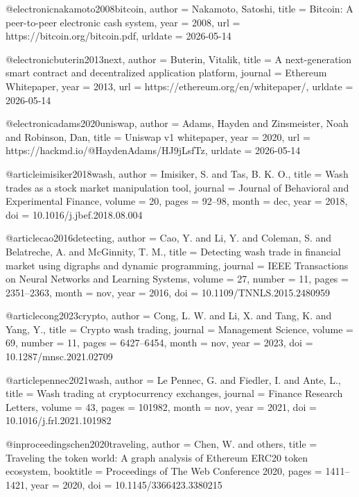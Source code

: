 @electronic{nakamoto2008bitcoin,
  author = {Nakamoto, Satoshi},
  title = {Bitcoin: A peer-to-peer electronic cash system},
  year = {2008},
  url = {https://bitcoin.org/bitcoin.pdf},
  urldate = {2026-05-14}
}

@electronic{buterin2013next,
  author = {Buterin, Vitalik},
  title = {A next-generation smart contract and decentralized application platform},
  journal = {Ethereum Whitepaper},
  year = {2013},
  url = {https://ethereum.org/en/whitepaper/},
  urldate = {2026-05-14}
}

@electronic{adams2020uniswap,
  author = {Adams, Hayden and Zinsmeister, Noah and Robinson, Dan},
  title = {Uniswap v1 whitepaper},
  year = {2020},
  url = {https://hackmd.io/@HaydenAdams/HJ9jLsfTz},
  urldate = {2026-05-14}
}

@article{imisiker2018wash,
  author = {Imisiker, S. and Tas, B. K. O.},
  title = {Wash trades as a stock market manipulation tool},
  journal = {Journal of Behavioral and Experimental Finance},
  volume = {20},
  pages = {92--98},
  month = {dec},
  year = {2018},
  doi = {10.1016/j.jbef.2018.08.004}
}

@article{cao2016detecting,
  author = {Cao, Y. and Li, Y. and Coleman, S. and Belatreche, A. and McGinnity, T. M.},
  title = {Detecting wash trade in financial market using digraphs and dynamic programming},
  journal = {IEEE Transactions on Neural Networks and Learning Systems},
  volume = {27},
  number = {11},
  pages = {2351--2363},
  month = {nov},
  year = {2016},
  doi = {10.1109/TNNLS.2015.2480959}
}

@article{cong2023crypto,
  author = {Cong, L. W. and Li, X. and Tang, K. and Yang, Y.},
  title = {Crypto wash trading},
  journal = {Management Science},
  volume = {69},
  number = {11},
  pages = {6427--6454},
  month = {nov},
  year = {2023},
  doi = {10.1287/mnsc.2021.02709}
}

@article{pennec2021wash,
  author = {Le Pennec, G. and Fiedler, I. and Ante, L.},
  title = {Wash trading at cryptocurrency exchanges},
  journal = {Finance Research Letters},
  volume = {43},
  pages = {101982},
  month = {nov},
  year = {2021},
  doi = {10.1016/j.frl.2021.101982}
}

@inproceedings{chen2020traveling,
  author = {Chen, W. and others},
  title = {Traveling the token world: A graph analysis of Ethereum ERC20 token ecosystem},
  booktitle = {Proceedings of The Web Conference 2020},
  pages = {1411--1421},
  year = {2020},
  doi = {10.1145/3366423.3380215}
}

